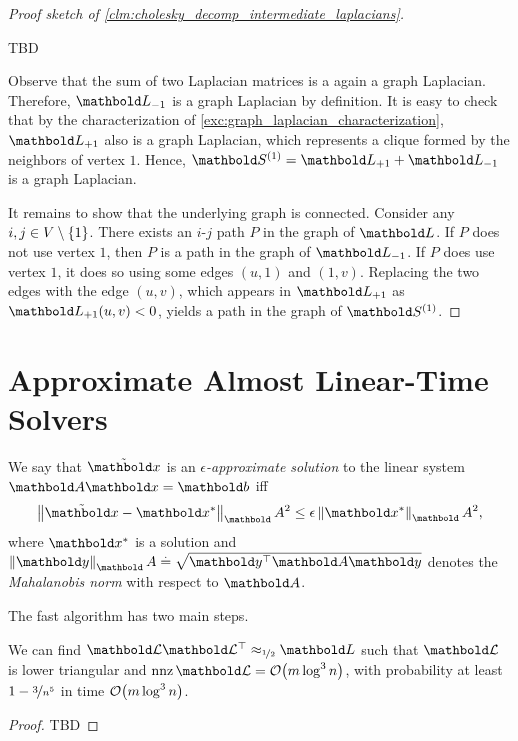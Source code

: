 \begin{proof}[Proof sketch of \cref{clm:cholesky_decomp_intermediate_laplacians}]
\begin{marginfigure}
TBD
\caption{$\mS^{(1)}$ is the Laplacian matrix of the graph, where the first vertex was removed and all of its neighbors are made to be in a clique.}
\end{marginfigure}

Observe that the sum of two Laplacian matrices is a again a graph Laplacian. Therefore, $\mL_{-1}$ is a graph Laplacian by definition. It is easy to check that by the characterization of \cref{exc:graph_laplacian_characterization}, $\mL_{+1}$ also is a graph Laplacian, which represents a clique formed by the neighbors of vertex $1$. Hence, $\mS^{(1)} = \mL_{+1} + \mL_{-1}$ is a graph Laplacian.

It remains to show that the underlying graph is connected. Consider any $i,j \in V \setminus \{1\}$. There exists an $i$-$j$ path $P$ in the graph of $\mL$. If $P$ does not use vertex $1$, then $P$ is a path in the graph of $\mL_{-1}$. If $P$ does use vertex $1$, it does so using some edges $(u,1)$ and $(1,v)$. Replacing the two edges with the edge $(u,v)$, which appears in $\mL_{+1}$ as $\mL_{+1}(u,v) < 0$, yields a path in the graph of $\mS^{(1)}$.
\end{proof}

\section{Approximate Almost Linear-Time Solvers}

\begin{defn} We say that $\Tilde{\vx}$ is an \emph{$\epsilon$-approximate solution} to the linear system $\mA\vx = \vb$ iff \begin{align}
    \norm{\Tilde{\vx} - \s{\vx}}_\mA^2 \leq \epsilon \norm{\s{\vx}}_\mA^2,
\end{align} where $\s{\vx}$ is a solution and $\norm{\vy}_\mA \defeq \sqrt{\trans{\vy}\mA\vy}$ denotes the \emph{Mahalanobis norm} with respect to $\mA$.
\end{defn}

The fast algorithm has two main steps.

\begin{thm} We can find $\mCalL\trans{\mCalL} \approx_{\nicefrac{1}{2}} \mL$ such that $\mCalL$ is lower triangular and $\nnz{\mCalL} = \LandauO{m \log^3 n}$, with probability at least $1 - \nicefrac{3}{n^5}$ in time $\LandauO{m \log^3 n}$.\cite{kyng2016approximate}
\end{thm}
\begin{proof}
TBD
\end{proof}

